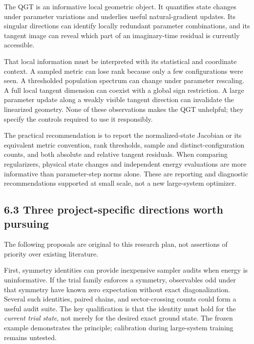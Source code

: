 \documentclass[
  11pt,
  a4paper,
]{article}
\begin{document}
The QGT is an informative local geometric object. It quantifies state
changes under parameter variations and underlies useful natural-gradient
updates. Its singular directions can identify locally redundant
parameter combinations, and its tangent image can reveal which part of
an imaginary-time residual is currently accessible.

That local information must be interpreted with its statistical and
coordinate context. A sampled metric can lose rank because only a few
configurations were seen. A thresholded population spectrum can change
under parameter rescaling. A full local tangent dimension can coexist
with a global sign restriction. A large parameter update along a weakly
visible tangent direction can invalidate the linearized geometry. None
of these observations makes the QGT unhelpful; they specify the controls
required to use it responsibly.

The practical recommendation is to report the normalized-state Jacobian
or its equivalent metric convention, rank thresholds, sample and
distinct-configuration counts, and both absolute and relative tangent
residuals. When comparing regularizers, physical state changes and
independent energy evaluations are more informative than parameter-step
norms alone. These are reporting and diagnostic recommendations
supported at small scale, not a new large-system optimizer.

\hypertarget{three-project-specific-directions-worth-pursuing}{%
\subsection{6.3 Three project-specific directions worth
pursuing}\label{three-project-specific-directions-worth-pursuing}}

The following proposals are original to this research plan, not
assertions of priority over existing literature.

First, symmetry identities can provide inexpensive sampler audits when
energy is uninformative. If the trial family enforces a symmetry,
observables odd under that symmetry have known zero expectation without
exact diagonalization. Several such identities, paired chains, and
sector-crossing counts could form a useful audit suite. The key
qualification is that the identity must hold for the \emph{current trial
state}, not merely for the desired exact ground state. The frozen
example demonstrates the principle; calibration during large-system
training remains untested.
\end{document}
